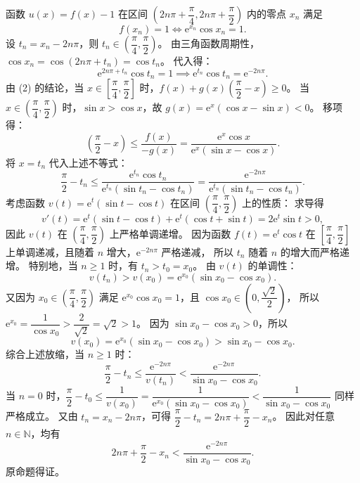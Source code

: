 \begin{answer}
函数 $u(x) = f(x) - 1$ 在区间 $\left(2n\pi + \dfrac{\pi}{4}, 2n\pi + \dfrac{\pi}{2}\right)$ 内的零点 $x_n$ 满足
\nopagebreak[4]
\[f(x_n) = 1 \iff \mathrm{e}^{x_n}\cos x_n = 1.\]
设 $t_n = x_n - 2n\pi$，则 $t_n \in \left(\dfrac{\pi}{4}, \dfrac{\pi}{2}\right)$。
由三角函数周期性，$\cos x_n = \cos(2n\pi + t_n) = \cos t_n$。
代入得：
\nopagebreak[4]
\[\mathrm{e}^{2n\pi + t_n} \cos t_n = 1 \implies \mathrm{e}^{t_n} \cos t_n = \mathrm{e}^{-2n\pi}.\]
由 (2) 的结论，当 $x \in \left[\dfrac{\pi}{4}, \dfrac{\pi}{2}\right]$ 时，$f(x) + g(x)\left(\dfrac{\pi}{2} - x\right) \geqslant 0$。
当 $x \in \left(\dfrac{\pi}{4}, \dfrac{\pi}{2}\right)$ 时，$\sin x > \cos x$，故 $g(x) = \mathrm{e}^x(\cos x - \sin x) < 0$。
移项得：
\nopagebreak[4]
\[\left(\frac{\pi}{2} - x\right) \leqslant \frac{f(x)}{-g(x)} = \frac{\mathrm{e}^x\cos x}{\mathrm{e}^x(\sin x - \cos x)}.\]
将 $x = t_n$ 代入上述不等式：
\nopagebreak[4]
\[\frac{\pi}{2} - t_n \leqslant \frac{\mathrm{e}^{t_n}\cos t_n}{\mathrm{e}^{t_n}(\sin t_n - \cos t_n)} = \frac{\mathrm{e}^{-2n\pi}}{\mathrm{e}^{t_n}(\sin t_n - \cos t_n)}.\]
考虑函数 $v(t) = \mathrm{e}^t(\sin t - \cos t)$ 在区间 $\left(\dfrac{\pi}{4}, \dfrac{\pi}{2}\right)$ 上的性质：
求导得
\nopagebreak[4]
\[v'(t) = \mathrm{e}^t(\sin t - \cos t) + \mathrm{e}^t(\cos t + \sin t) = 2\mathrm{e}^t \sin t > 0,\]
因此 $v(t)$ 在 $\left(\dfrac{\pi}{4}, \dfrac{\pi}{2}\right)$ 上严格单调递增。
因为函数 $f(t) = \mathrm{e}^t \cos t$ 在 $\left[\dfrac{\pi}{4}, \dfrac{\pi}{2}\right]$ 上单调递减，且随着 $n$ 增大，$\mathrm{e}^{-2n\pi}$ 严格递减，
所以 $t_n$ 随着 $n$ 的增大而严格递增。
特别地，当 $n \geqslant 1$ 时，有 $t_n > t_0 = x_0$。
由 $v(t)$ 的单调性：
\nopagebreak[4]
\[v(t_n) > v(x_0) = \mathrm{e}^{x_0}(\sin x_0 - \cos x_0).\]
又因为 $x_0 \in \left(\dfrac{\pi}{4}, \dfrac{\pi}{2}\right)$ 满足 $\mathrm{e}^{x_0} \cos x_0 = 1$，且 $\cos x_0 \in \left(0, \dfrac{\sqrt{2}}{2}\right)$，
所以 $\mathrm{e}^{x_0} = \dfrac{1}{\cos x_0} > \dfrac{2}{\sqrt{2}} = \sqrt{2} > 1$。
因为 $\sin x_0 - \cos x_0 > 0$，所以
\nopagebreak[4]
\[v(x_0) = \mathrm{e}^{x_0}(\sin x_0 - \cos x_0) > \sin x_0 - \cos x_0.\]
综合上述放缩，当 $n \geqslant 1$ 时：
\nopagebreak[4]
\[\frac{\pi}{2} - t_n \leqslant \frac{\mathrm{e}^{-2n\pi}}{v(t_n)} < \frac{\mathrm{e}^{-2n\pi}}{\sin x_0 - \cos x_0}.\]
当 $n = 0$ 时，$\dfrac{\pi}{2} - t_0 \leqslant \dfrac{1}{v(x_0)} = \dfrac{1}{\mathrm{e}^{x_0}(\sin x_0 - \cos x_0)} < \dfrac{1}{\sin x_0 - \cos x_0}$ 同样严格成立。
又由 $t_n = x_n - 2n\pi$，可得 $\dfrac{\pi}{2} - t_n = 2n\pi + \dfrac{\pi}{2} - x_n$。
因此对任意 $n \in \mathbb{N}$，均有
\nopagebreak[4]
\[2n\pi + \frac{\pi}{2} - x_n < \frac{\mathrm{e}^{-2n\pi}}{\sin x_0 - \cos x_0}.\]
原命题得证。




\end{answer}